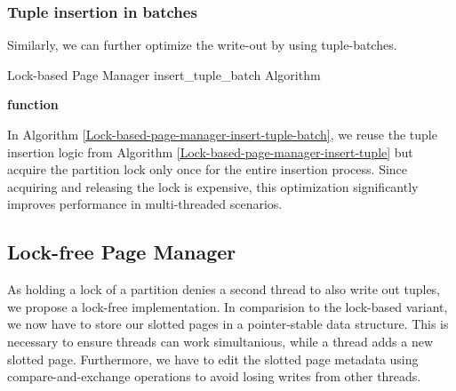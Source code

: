 \subsubsection*{Tuple insertion in batches}
Similarly, we can further optimize the write-out by using tuple-batches.
\begin{algorithm}[h]
  \caption{Lock-based Page Manager insert\_tuple\_batch Algorithm}\label{Lock-based-page-manager-insert-tuple-batch}


  \textbf{function} \end{algorithm} In Algorithm \ref{Lock-based-page-manager-insert-tuple-batch}, we reuse the tuple insertion logic from Algorithm \ref{Lock-based-page-manager-insert-tuple} but acquire the partition lock only once for the entire insertion process.
Since acquiring and releasing the lock is expensive, this optimization significantly improves performance in multi-threaded scenarios.

\subsection{Lock-free Page Manager}
As holding a lock of a partition denies a second thread to also write out tuples, we propose a lock-free implementation.
In comparision to the lock-based variant, we now have to store our slotted pages in a pointer-stable data structure.
This is necessary to ensure threads can work simultanious, while a thread adds a new slotted page.
Furthermore, we have to edit the slotted page metadata using compare-and-exchange operations to avoid losing writes from other threads.

